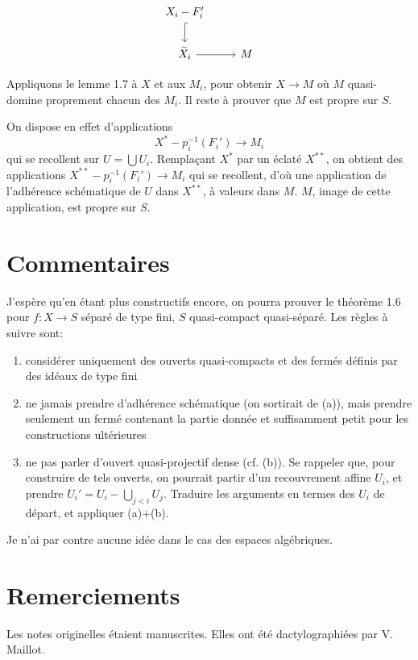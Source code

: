 \documentclass[11pt,a4paper]{article}
\theoremstyle{plain}
\theoremstyle{definition}
\begin{document}
\[
\begin{tikzcd}
X_i - F_i' \arrow[d, hook] \\
\widetilde{X}_i \arrow[r] & M
\end{tikzcd}
\]

Appliquons le lemme 1.7 \`a $X$ et aux $M_i$, pour obtenir $X \to M$ o\`u $M$ quasi-domine proprement chacun des $M_i$. Il reste \`a prouver que $M$ est propre sur $S$.

On dispose en effet d'applications
\[
X^* - p_i^{-1}(F_i') \to M_i
\]
qui se recollent sur $U = \bigcup U_i$. Rempla\c{c}ant $X^*$ par un \'eclat\'e $X^{**}$, on obtient des applications $X^{**} - p_i^{-1}(F_i') \to M_i$ qui se recollent, d'o\`u une application de l'adh\'erence sch\'ematique de $U$ dans $X^{**}$, \`a valeurs dans $M$. $M$, image de cette application, est propre sur $S$.

\section*{Commentaires}

J'esp\`ere qu'en \'etant plus constructifs encore, on pourra prouver le th\'eor\`eme 1.6 pour $f: X \to S$ s\'epar\'e de type fini, $S$ quasi-compact quasi-s\'epar\'e. Les r\`egles \`a suivre sont:
\begin{enumerate}[label=(\alph*)]
\item consid\'erer uniquement des ouverts quasi-compacts et des ferm\'es d\'efinis par des id\'eaux de type fini
\item ne jamais prendre d'adh\'erence sch\'ematique (on sortirait de (a)), mais prendre seulement un ferm\'e contenant la partie donn\'ee et suffisamment petit pour les constructions ult\'erieures
\item ne pas parler d'ouvert quasi-projectif dense (cf. (b)). Se rappeler que, pour construire de tels ouverts, on pourrait partir d'un recouvrement affine $U_i$, et prendre $U_i' = U_i - \bigcup_{j<i} U_j$. Traduire les arguments en termes des $U_i$ de d\'epart, et appliquer (a)+(b).
\end{enumerate}

Je n'ai par contre aucune id\'ee dans le cas des espaces alg\'ebriques.

\section*{Remerciements}

Les notes originelles \'etaient manuscrites. Elles ont \'et\'e dactylographi\'ees par V. Maillot.
\end{document}

